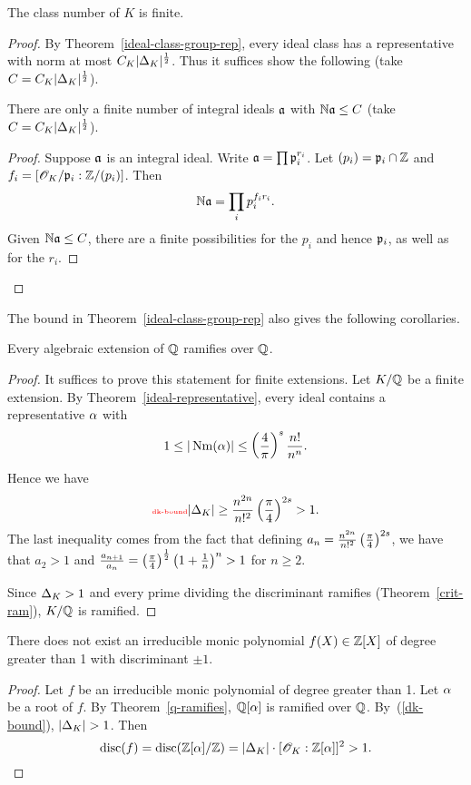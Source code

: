 \begin{thm}
The class number of $K$ is finite. 
\end{thm}
\begin{proof}
By Theorem~\ref{ideal-class-group-rep}, every ideal class has a representative with norm at most $C_K|\Delta_K|^{\frac{1}{2}}$. Thus it suffices show 
the following (take $C=C_K|\Delta_K|^{\frac{1}{2}}$).
\begin{lem}
There are only a finite number of integral ideals $\mathfrak{a}$ with $\mathbb{N}\mathfrak{a}\le C$ (take $C=C_K|\Delta_K|^{\frac{1}{2}}$).
\end{lem}
\begin{proof}
Suppose $\mathfrak{a}$ is an integral ideal. Write $\mathfrak{a}=\prod \mathfrak{p}_i^{r_i}$. Let $(p_i)=\mathfrak{p}_i\cap \mathbb{Z}$ and $f_i=[\mathscr{O}_K/\mathfrak{p}_i:\mathbb{Z}/(p_i)]$. Then
\[
\mathbb{N}\mathfrak{a}=\prod_i p_i^{f_ir_i}.
\]
Given $\mathbb{N}\mathfrak{a}\le C$, there are a finite possibilities for the $p_i$ and hence $\mathfrak{p}_i$, as well as for the $r_i$.
\end{proof}
\end{proof}
The bound in Theorem~\ref{ideal-class-group-rep} also gives the following corollaries.
\begin{thm}
Every algebraic extension of $\mathbb{Q}$ ramifies over $\mathbb{Q}$.
\end{thm}
\begin{proof}
It suffices to prove this statement for finite extensions. 
Let $K/\mathbb{Q}$ be a finite extension.
By Theorem~\ref{ideal-representative}, every ideal contains a representative $\alpha$ with
\[
1\le |\operatorname{Nm}(\alpha)|\le \left( {\frac{4}{\pi}} \right)^s\frac{n!}{n^n}.
\]
Hence we have
\begin{equation}
\llabel{dk-bound}
|\De_K|\ge \frac{n^{2n}}{n!^2}\pf{\pi}{4}^{2s}>1.
\end{equation}
The last inequality comes from the fact that defining $a_n=\frac{n^{2n}}{n!^2}\left( {\frac{\pi}{4}} \right)^{2s}$, we have that $a_2>1$ and $\frac{a_{n+1}}{a_n}=\left( {\frac{\pi}{4}} \right)^{\frac{1}{2}}\left( {1+\frac{1}{n}} \right)^n>1$ for $n\ge 2$.

Since $\Delta_K>1$ and every prime dividing the discriminant ramifies (Theorem~\ref{crit-ram}), $K/\mathbb{Q}$ is ramified.
\end{proof}
\begin{cor}
There does not exist an irreducible monic polynomial $f(X)\in \mathbb{Z}[X]$ of degree greater than 1 with discriminant $\pm 1$.
\end{cor}
\begin{proof}
Let $f$ be an irreducible monic polynomial of degree greater than 1. Let $\alpha$ be a root of $f$. By Theorem~\ref{q-ramifies}, $\mathbb{Q}[\alpha]$ is ramified over $\mathbb{Q}$. By~(\ref{dk-bound}), $|\De_K|>1$. Then 
\[\operatorname{disc}(f)=\operatorname{disc}(\mathbb{Z}[\alpha]/\mathbb{Z})=|\Delta_K|\cdot [\mathscr{O}_K:\mathbb{Z}[\alpha]]^2>1.\qedhere\]
\end{proof}
